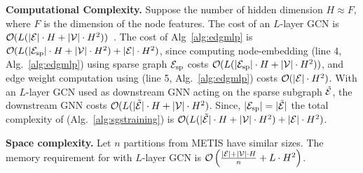 \textbf{Computational Complexity.}
Suppose the number of hidden dimension $H\approx F$, where $F$ is the dimension of the node features. The cost of an $L$-layer GCN is $\bigO(L(|\gE|\cdot H + |\gV| \cdot H^2))$~\cite{chiang2019cluster}. 
The cost of Alg~\ref{alg:edgmlp} is $\bigO(L(|\gE_\mathrm{sp}|\cdot H + |\gV| \cdot H^2)+ \abs{\gE}\cdot H^2)$, since computing node-embedding (line 4, Alg.~\ref{alg:edgmlp}) using sparse graph ${\mathcal{E}}_\mathrm{sp}$ costs $\bigO(L(|\gE_\mathrm{sp}|\cdot H + |\gV| \cdot H^2))$, and edge weight computation using \mlp (line 5, Alg.~\ref{alg:edgmlp}) costs $\bigO(\abs{\gE}\cdot H^2)$. 
% 
With an $L$-layer GCN used as downstream GNN acting on the sparse subgraph $\tilde{{\mathcal{E}}}$, the downstream GNN costs $\bigO(L(|\tilde{\gE}|\cdot H + |\gV| \cdot H^2)$. 
Since, $\lvert{\mathcal{E}}_\mathrm{sp}\rvert=\lvert\tilde{{\mathcal{E}}}\rvert$ the total complexity of \sgs  (Alg.~\ref{alg:sgstraining}) is $\bigO(L(|\tilde{\gE}|\cdot H + |\gV| \cdot H^2)+ \abs{\gE}\cdot H^2)$.

\textbf{Space complexity.} Let $n$ partitions from METIS have similar sizes. The memory requirement for \sgs with $L$-layer GCN is  $\bigO\left(\frac{|\gE| + |\gV|\cdot H}{n} + L \cdot H^2 \right)$. 





